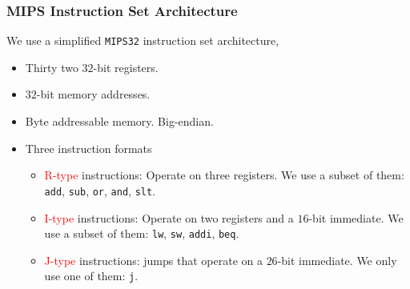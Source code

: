 \documentclass{beamer}
\begin{document}
\begin{frame}%
\frametitle{MIPS Instruction Set Architecture}

  We use a simplified \texttt{MIPS32} instruction set architecture,

  \begin{itemize}
  \item Thirty two $32$-bit registers.
  \item $32$-bit memory addresses.
  \item Byte addressable memory. Big-endian.
  \item Three instruction formats
    \begin{itemize}
    \item \textcolor{red}{R-type} instructions: Operate on three registers. We use a subset of them: \lstinline{add}, \lstinline{sub}, \lstinline{or}, \lstinline{and}, \lstinline{slt}.
      \vspace{0.2cm}
    \item \textcolor{red}{I-type} instructions: Operate on two registers and a $16$-bit immediate. We use a subset of them: \lstinline{lw}, \lstinline{sw}, \lstinline{addi}, \lstinline{beq}.
      \vspace{0.2cm}
    \item \textcolor{red}{J-type} instructions: jumps that operate on a $26$-bit immediate. We only use one of them: \lstinline{j}.
    \end{itemize}
  \end{itemize}

\end{frame}
\end{document}
